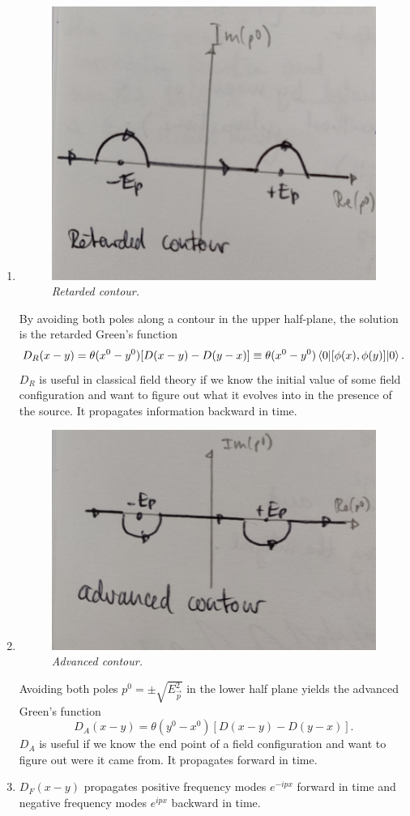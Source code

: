 \begin{enumerate}
		\item
		\begin{figure}[h]
			\centering
			\includegraphics[width=0.7\linewidth]{gfx/Retardedcontour}
			\caption{\itshape Retarded contour.}
			\label{fig:retardedcontour}
		\end{figure} 
	 By avoiding both poles along a contour in the upper half-plane, the solution is the retarded Green's function
		\begin{equation}
			D_R(x-y)=\theta(x^0-y^0) [D(x-y)-D(y-x)]\equiv \theta(x^0-y^0) \expval{[\phi(x),\phi(y)]}{0}.
		\end{equation}
$D_R$ is useful in classical field theory if we know the initial value of some field configuration and want to figure out what it evolves into in the presence of the source.
It propagates information backward in time.
\item 
\begin{figure}[h]
	\centering
	\includegraphics[width=0.7\linewidth]{gfx/Advancedcontour}
	\caption{\itshape Advanced contour.}
	\label{fig:advancedcontour}
\end{figure}
Avoiding both poles $p^0 = \pm \sqrt{E^2_{\vec{p}}}$ in the lower half plane yields the advanced Green's function
\begin{equation}
	D_A (x-y) = \theta(y^0-x^0) [D(x-y)-D(y-x)].
\end{equation}
$D_A$ is useful if we know the end point of a field configuration and want to figure out were it came from. It propagates forward in time.
\item $D_F(x-y)$ propagates positive frequency modes $e^{- i px}$ forward in time and negative frequency modes $e^{ipx}$ backward in time.
\end{enumerate}
